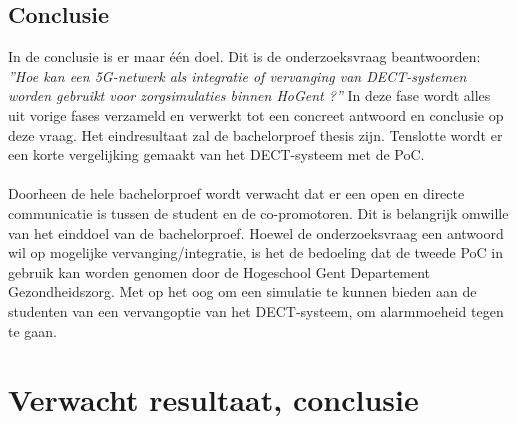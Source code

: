 \subsection{Conclusie}
In de conclusie is er maar één doel. Dit is de onderzoeksvraag beantwoorden: \textit{''Hoe kan een 5G-netwerk als integratie of vervanging van DECT-systemen worden gebruikt voor zorgsimulaties binnen HoGent ?''} In deze fase wordt alles uit vorige fases verzameld en verwerkt tot een concreet antwoord en conclusie op deze vraag. Het eindresultaat zal de bachelorproef thesis zijn. Tenslotte wordt er een korte vergelijking gemaakt van het DECT-systeem met de PoC.
\\\\
Doorheen de hele bachelorproef wordt verwacht dat er een open en directe communicatie is tussen de student en de co-promotoren. Dit is belangrijk omwille van het einddoel van de bachelorproef. Hoewel de onderzoeksvraag een antwoord wil op mogelijke vervanging/integratie, is het de bedoeling dat de tweede PoC in gebruik kan worden genomen door de Hogeschool Gent Departement Gezondheidszorg. Met op het oog om een simulatie te kunnen bieden aan de studenten van een vervangoptie van het DECT-systeem, om alarmmoeheid tegen te gaan.

\section{Verwacht resultaat, conclusie}%
\label{sec:verwachte_resultaten}

